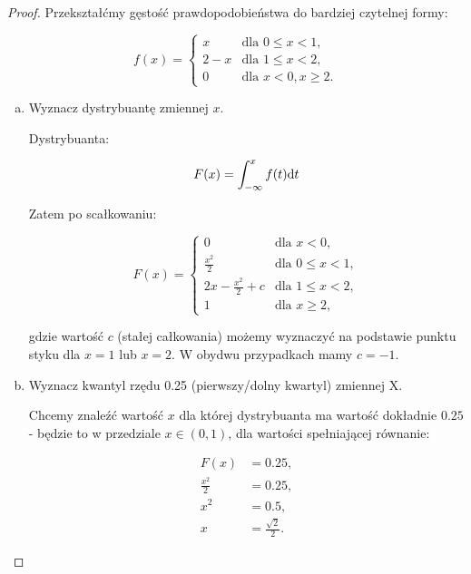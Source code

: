 \documentclass[11pt]{article}
\theoremstyle{definition}
\numberwithin{zadanie}{section}
\begin{document}
\begin{proof}
    Przekształćmy gęstość prawdopodobieństwa do bardziej czytelnej formy:

    \[
        f(x) = \left\{\begin{array}{lr}
            x   & \text{dla } 0\leq x < 1,  \\
            2-x & \text{dla } 1\leq x < 2,  \\
            0   & \text{dla } x<0, x\geq 2.
        \end{array}\right.
    \]


    \begin{enumerate}[a)]
        \item Wyznacz dystrybuantę zmiennej $x$.

              Dystrybuanta:

              $$F(x) = \int_{-\infty}^xf(t)\text dt$$

              Zatem po scałkowaniu:

              \[
                  F(x) = \left\{\begin{array}{lr}
                      0                  & \text{dla } x < 0,       \\
                      \frac{x^2}2        & \text{dla } 0\leq x < 1, \\
                      2x-\frac{x^2}2 + c & \text{dla } 1\leq x < 2, \\
                      1                  & \text{dla } x\geq 2,
                  \end{array}\right.
              \]

              gdzie wartość $c$ (stałej całkowania) możemy wyznaczyć na podstawie punktu styku dla $x=1$ lub $x=2$. W obydwu przypadkach mamy $c=-1$.

        \item Wyznacz kwantyl rzędu 0.25 (pierwszy/dolny kwartyl) zmiennej X.

              Chcemy znaleźć wartość $x$ dla której dystrybuanta ma wartość dokładnie $0.25$ - będzie to w przedziale $x\in(0,1)$, dla wartości spełniającej równanie:

              \begin{align*}
                  F(x)        & = 0.25,             \\
                  \frac{x^2}2 & = 0.25,             \\
                  x^2         & =0.5,               \\
                  x           & = \frac{\sqrt{2}}2.
              \end{align*}



    \end{enumerate}

\end{proof}
\end{document}
